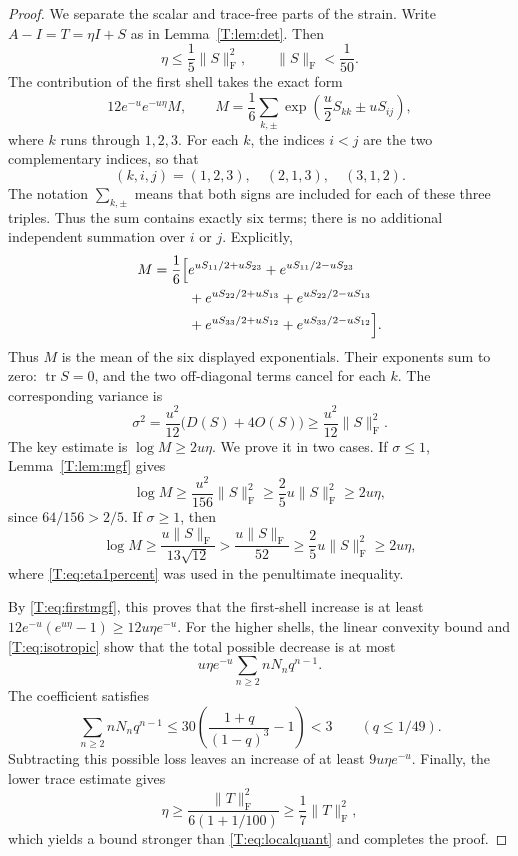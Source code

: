 \documentclass[10pt,a4paper]{amsart}
\newcommand{\Id}{I}
\newcommand{\frob}{\mathrm F}
\newcommand{\tr}{\operatorname{tr}}
\begin{document}
\begin{proof}
We separate the scalar and trace-free parts of the strain. Write
$A-\Id=T=\eta\Id+S$ as in Lemma~\ref{T:lem:det}. Then
\begin{equation}\label{T:eq:eta1percent}
 \eta\le\frac15\|S\|_{\frob}^2,
 \qquad \|S\|_{\frob}<\frac1{50}.
\end{equation}
The contribution of the first shell takes the exact form
\begin{equation}\label{T:eq:firstmgf}
 12e^{-u}e^{-u\eta}M,
 \qquad
 M=\frac16\sum_{k,\pm}
 \exp\left(\frac u2S_{kk}\pm uS_{ij}\right),
\end{equation}
where $k$ runs through $1,2,3$. For each $k$, the indices $i<j$
are the two complementary indices, so that
\[
 (k,i,j)=(1,2,3),\quad (2,1,3),\quad (3,1,2).
\]
The notation $\sum_{k,\pm}$ means that both signs are included for each
of these three triples. Thus the sum contains exactly six terms;
there is no additional independent summation over $i$ or $j$.
Explicitly,
\[
\begin{aligned}
 M=\frac16\Bigl[{}
 &e^{uS_{11}/2+uS_{23}}+e^{uS_{11}/2-uS_{23}}\\
 &+e^{uS_{22}/2+uS_{13}}+e^{uS_{22}/2-uS_{13}}\\
 &+e^{uS_{33}/2+uS_{12}}+e^{uS_{33}/2-uS_{12}}
 \Bigr].
\end{aligned}
\]
Thus $M$ is the mean of the six displayed exponentials. Their
exponents sum to zero: $\tr S=0$, and the two off-diagonal terms
cancel for each $k$. The corresponding variance is
\begin{equation}\label{T:eq:variance}
 \sigma^2=\frac{u^2}{12}\bigl(D(S)+4O(S)\bigr)
 \ge\frac{u^2}{12}\|S\|_{\frob}^2.
\end{equation}
The key estimate is $\log M\ge2u\eta$. We prove it in two cases.
If $\sigma\le1$, Lemma~\ref{T:lem:mgf} gives
\[
 \log M\ge\frac{u^2}{156}\|S\|_{\frob}^2
 \ge\frac25u\|S\|_{\frob}^2\ge2u\eta,
\]
since $64/156>2/5$. If $\sigma\ge1$, then
\[
 \log M\ge\frac{u\|S\|_{\frob}}{13\sqrt{12}}
 >\frac{u\|S\|_{\frob}}{52}
 \ge\frac25u\|S\|_{\frob}^2\ge2u\eta,
\]
where \eqref{T:eq:eta1percent} was used in the penultimate inequality.

By \eqref{T:eq:firstmgf}, this proves that the first-shell increase
is at least $12e^{-u}(e^{u\eta}-1)\ge12u\eta e^{-u}$.
For the higher shells, the linear convexity bound and
\eqref{T:eq:isotropic} show that the total possible decrease is at
most
\[
 u\eta e^{-u}\sum_{n\ge2}nN_nq^{n-1}.
\]
The coefficient satisfies
\begin{equation}\label{T:eq:highertail3}
 \sum_{n\ge2}nN_nq^{n-1}
 \le30\left(\frac{1+q}{(1-q)^3}-1\right)<3
 \qquad(q\le1/49).
\end{equation}
Subtracting this possible loss leaves an increase of at least
$9u\eta e^{-u}$. Finally, the lower trace estimate gives
\[
 \eta\ge\frac{\|T\|_{\frob}^2}{6(1+1/100)}
 \ge\frac17\|T\|_{\frob}^2,
\]
which yields a bound stronger than \eqref{T:eq:localquant} and
completes the proof.
\end{proof}
\end{document}
